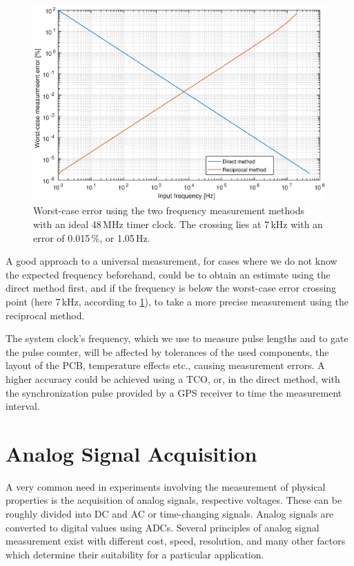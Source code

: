 \begin{figure}[h]
	\centering
	\includegraphics[width=\textwidth] {img/freqmethods.eps}
	\caption[Frequency measurement methods comparison]{\label{fig:freqmethods_graph}Worst-case error using the two frequency measurement methods with an ideal 48\,MHz timer clock. The crossing lies at 7\,kHz with an error of 0.015\,\%, or 1.05\,Hz.}
\end{figure}

A good approach to a universal measurement, for cases where we do not know the expected frequency beforehand, could be to obtain an estimate using the direct method first, and if the frequency is below the worst-case error crossing point (here 7\,kHz, according to \cref{fig:freqmethods_graph}), to take a more precise measurement using the reciprocal method.

The system clock's frequency, which we use to measure pulse lengths and to gate the pulse counter, will be affected by tolerances of the used components, the layout of the \gls{PCB}, temperature effects etc., causing measurement errors. A higher accuracy could be achieved using a \gls{TCO}, or, in the direct method, with the synchronization pulse provided by a \gls{GPS} receiver to time the measurement interval.

\section{Analog Signal Acquisition} \label{sec:theory_adc}

A very common need in experiments involving the measurement of physical properties is the acquisition of analog signals, respective voltages. These can be roughly divided into \gls{DC} and \gls{AC} or time-changing signals. Analog signals are converted to digital values using \glspl{ADC}. Several principles of analog signal measurement exist with different cost, speed, resolution, and many other factors which determine their suitability for a particular application.

